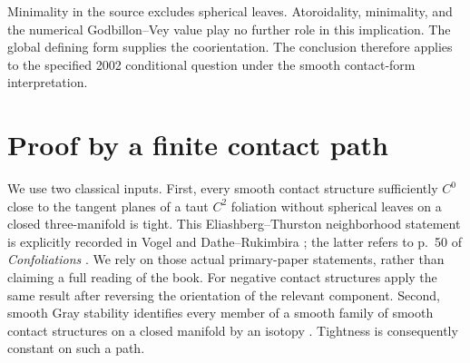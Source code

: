 \documentclass[11pt]{article}
\begin{document}
Minimality in the source excludes spherical leaves. Atoroidality,
minimality, and the numerical Godbillon--Vey value play no further
role in this implication. The global defining form supplies the
coorientation. The conclusion therefore applies to the specified
2002 conditional question under the smooth contact-form interpretation.

\section{Proof by a finite contact path}
We use two classical inputs. First, every smooth contact structure
sufficiently $C^0$ close to the tangent planes of a taut $C^2$
foliation without spherical leaves on a closed three-manifold is
tight. This Eliashberg--Thurston neighborhood statement is explicitly
recorded in Vogel \cite[p.~42]{V11} and Dathe--Rukimbira
\cite[Proposition 3.3, p.~5]{DR}; the latter refers to p.~50 of
\emph{Confoliations} \cite{ET}. We rely on those actual primary-paper
statements, rather than claiming a full reading of the book.
For negative contact structures apply the same result after reversing
the orientation of the relevant component. Second, smooth Gray
stability identifies every member of a smooth family of smooth contact
structures on a closed manifold by an isotopy
\cite[Theorem 2.9, p.~2451]{V16}. Tightness is consequently constant
on such a path.
\end{document}
